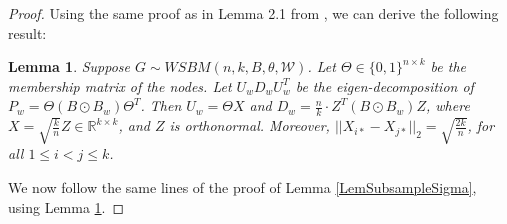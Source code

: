 \documentclass{article}
\newtheorem{lemma}{Lemma}
\begin{document}
\begin{proof}
Using the same proof as in Lemma 2.1 from \cite{LeiRin15}, we can derive the following result:

\begin{lemma}
\label{lemma:weighted_lemma2.1_lei_rin}
Suppose $G \sim WSBM(n, k, B, \theta, \mathscr{W})$. Let $\Theta \in \{0,1\}^{n \times k}$ be the membership matrix of the nodes. Let $U_wD_wU_w^T$ be the eigen-decomposition of $P_w = \Theta (B \odot B_w)\Theta^T$. Then $U_w = \Theta X$ and $D_w = \frac{n}{k} \cdot Z^T(B \odot B_w)Z$, where $X = \sqrt{\frac{k}{n}} Z \in \mathbb{R}^{k \times k}$, and $Z$ is orthonormal. Moreover, $||X_{i*} - X_{j*}||_2 = \sqrt{\frac{2k}{n}}$, for all $1 \leq i < j \leq k$.
\end{lemma}

We now follow the same lines of the proof of Lemma \ref{LemSubsampleSigma}, using Lemma \ref{lemma:weighted_lemma2.1_lei_rin}.
\end{proof}
\end{document}
